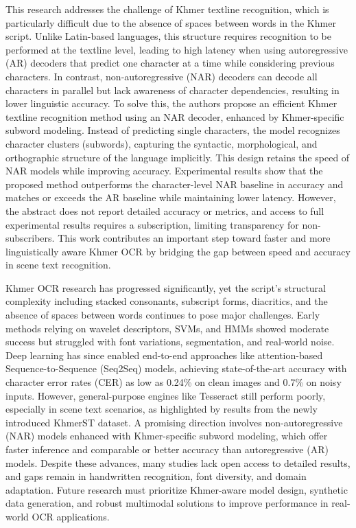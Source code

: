 {\citet{Rina2025} This research addresses the challenge of Khmer textline recognition, 
which is particularly difficult due to the absence of spaces between words in the Khmer script. 
Unlike Latin-based languages, this structure requires recognition to be performed at the textline level, 
leading to high latency when using autoregressive (AR) decoders that predict one character at a 
time while considering previous characters. In contrast, non-autoregressive (NAR) decoders can decode 
all characters in parallel but lack awareness of character dependencies, resulting in lower linguistic 
accuracy. To solve this, the authors propose an efficient Khmer textline recognition method using an NAR 
decoder, enhanced by Khmer-specific subword modeling. Instead of predicting single characters, the model 
recognizes character clusters (subwords), capturing the syntactic, morphological, and orthographic 
structure of the language implicitly. This design retains the speed of NAR models while improving accuracy. 
Experimental results show that the proposed method outperforms the character-level NAR baseline 
in accuracy and matches or exceeds the AR baseline while maintaining lower latency. However, 
the abstract does not report detailed accuracy or metrics, and access to full experimental results 
requires a subscription, limiting transparency for non-subscribers. This work contributes an 
important step toward faster and more linguistically aware Khmer OCR by bridging the gap between 
speed and accuracy in scene text recognition.

Khmer OCR research has progressed significantly, yet the script’s structural complexity including 
stacked consonants, subscript forms, diacritics, and the absence of spaces between words continues 
to pose major challenges. Early methods relying on wavelet descriptors, SVMs, and HMMs showed moderate 
success but struggled with font variations, segmentation, and real-world noise. Deep learning has 
since enabled end-to-end approaches like attention-based Sequence-to-Sequence (Seq2Seq) models, 
achieving state-of-the-art accuracy with character error rates (CER) as low as 0.24\% on clean 
images and 0.7\% on noisy inputs. However, general-purpose engines like Tesseract still perform 
poorly, especially in scene text scenarios, as highlighted by results from the newly introduced 
KhmerST dataset. A promising direction involves non-autoregressive (NAR) models enhanced with 
Khmer-specific subword modeling, which offer faster inference and comparable or better accuracy 
than autoregressive (AR) models. Despite these advances, many studies lack open access to detailed 
results, and gaps remain in handwritten recognition, font diversity, and domain adaptation. 
Future research must prioritize Khmer-aware model design, synthetic data generation, and robust 
multimodal solutions to improve performance in real-world OCR applications.
    


}
